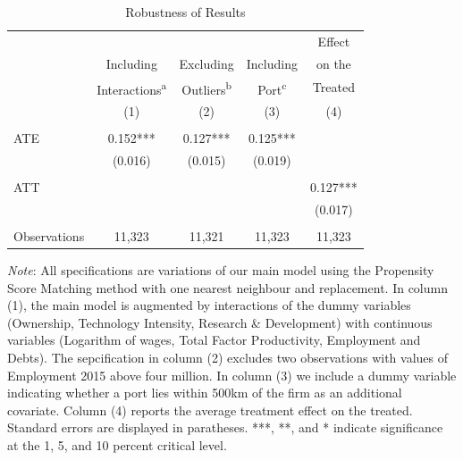 \documentclass[a4paper,11pt]{scrartcl}
\begin{document}
 
\begin{table}[h]
  \centering
   \caption{Robustness of Results}
   \label{tab:robust}
\begin{threeparttable}
 
\begin{tabular}{lcccc} 
	\hline 
	\hline
 		& & & & Effect \\
 		& Including & Excluding & Including & on the\\
 		& Interactions\textsuperscript{a} & Outliers\textsuperscript{b} 
 		& Port\textsuperscript{c} & Treated \\
 		& (1) & (2) & (3) & (4) \\ 
 	\hline
 		&  &  &  &  \\
ATE 	& 0.152*** & 0.127*** & 0.125*** &  \\
 		& (0.016) & (0.015) & (0.019) &  \\
 		&  &  &  &  \\
ATT 	&  &  &  & 0.127*** \\
 		&  &  &  & (0.017) \\
 		&  &  &  &  \\
Observations & 11,323 & 11,321 & 11,323 & 11,323 \\ 
	\hline
	\hline
\end{tabular}

\begin{tablenotes}[flushleft]
     \footnotesize  
\item \textit{Note}: All specifications are variations of our main model using the Propensity Score Matching method with one nearest neighbour and replacement. %
In column (1), the main model is augmented by interactions of the dummy variables (Ownership, Technology Intensity, Research \& Development) with continuous variables (Logarithm of wages, Total Factor Productivity, Employment and Debts).  The sepcification in column (2) excludes two observations with values of Employment 2015 above four million. In column (3) we include a dummy variable indicating whether a port lies within 500km of the firm as an additional covariate. Column (4) reports the average treatment effect on the treated. Standard errors are displayed in paratheses. ***, **, and * indicate significance at the 1, 5, and 10 percent critical level. 


\end{tablenotes}
\end{threeparttable}
\end{table}
\end{document}
